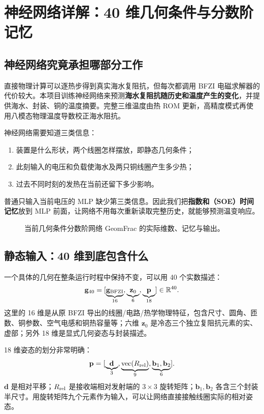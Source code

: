 \chapter{神经网络详解：40 维几何条件与分数阶记忆}
\label{ch:neural}

\section{神经网络究竟承担哪部分工作}
直接物理计算可以逐热步得到真实海水复阻抗，但每次都调用 BFZI 电磁求解器的代价较大。本项目训练神经网络来预测\textbf{海水复阻抗随历史和温度产生的变化}，并提供海水、封装、铜的温度摘要。完整三维温度由热 ROM 更新，高精度模式再使用八模态物理温度导数校正海水阻抗。

神经网络需要知道三类信息：
\begin{enumerate}
\item 装置是什么形状，两个线圈怎样摆放，即静态几何条件；
\item 此刻输入的电压和负载使海水及两只铜线圈产生多少热；
\item 过去不同时刻的发热在当前还留下多少影响。
\end{enumerate}
普通只输入当前电压的 MLP 缺少第三类信息。因此我们把\textbf{指数和（SOE）时间记忆}放到 MLP 前面，让网络不用每次重新读取完整历史，就能够预测温变响应。

\begin{figure}[htbp]
\centering\resizebox{\textwidth}{!}{}
\caption{当前几何条件分数阶网络 GeomFrac 的实际维数、记忆与输出。}
\label{fig:network}
\end{figure}

\section{静态输入：40 维到底包含什么}
\label{sec:geometry40}
一个具体的几何在整条运行时程中保持不变，可以用 40 个实数描述：
\begin{equation}
\label{eq:geom40}
\mathbf g_{40}=
[\underbrace{\mathbf g_{\rm BFZI}}_{16},
 \underbrace{\mathbf z_0}_{6},
 \underbrace{\mathbf p}_{18}]
\in\mathbb R^{40}.
\end{equation}
这里的 16 维是从原 BFZI 导出的线圈/电路/热学物理特征，包含尺寸、圆角、匝数、铜参数、空气电感和铜热容量等；六维 $\mathbf z_0$ 是冷态三个独立复阻抗元素的实、虚部；另外 18 维是显式几何姿态与封装描述。

18 维姿态的划分非常明确：
\[
\mathbf p=
[\underbrace{\mathbf d}_{3},
 \underbrace{\operatorname{vec}(R_{\rm rel})}_{9},
 \underbrace{\mathbf b_1,\mathbf b_2}_{6}].
\]
$\mathbf d$ 是相对平移；$R_{\rm rel}$ 是接收端相对发射端的 $3\times3$ 旋转矩阵；$\mathbf b_1,\mathbf b_2$ 各含三个封装半尺寸。用旋转矩阵九个元素作为输入，可以让网络直接接触线圈实际的相对姿态。

